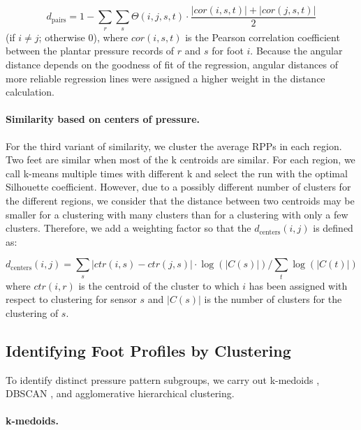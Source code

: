 \documentclass[
  oneside]{book}
\begin{document}
\begin{equation}
d_{\text{pairs}}=1-\sum_{r}\sum_{s} \Theta(i,j,s,t)\cdot \frac{|cor(i,s,t)| + |cor(j,s,t)|}{2}
\label{eq:simpairs}
\end{equation}
(if \(i\neq j\); otherwise 0), where \(cor(i,s,t)\) is the Pearson correlation coefficient between the plantar pressure records of \(r\) and \(s\) for foot \(i\).
Because the angular distance depends on the goodness of fit of the regression, angular distances of more reliable regression lines were assigned a higher weight in the distance calculation.

\paragraph*{Similarity based on centers of pressure.}

For the third variant of similarity, we cluster the average RPPs in each region.
Two feet are similar when most of the k centroids are similar.
For each region, we call k-means multiple times with different k and select the run with the optimal Silhouette coefficient.
However, due to a possibly different number of clusters for the different regions, we consider that the distance between two centroids may be smaller for a clustering with many clusters than for a clustering with only a few clusters. Therefore, we add a weighting factor so that the \(d_{\text{centers}}(i,j)\) is defined as:

\begin{equation}
d_{\text{centers}}(i,j) = \sum_{s}{}\left|ctr(i,s) - ctr(j,s)\right| \cdot \log(|C(s)|)/\sum_{t}\log(|C(t)|)
\label{eq:simcenters}
\end{equation}
where \(ctr(i,r)\) is the centroid of the cluster to which \(i\) has been assigned with respect to clustering for sensor \(s\) and \(|C(s)|\) is the number of clusters for the clustering of \(s\).

\hypertarget{diabfoot-approach-clustering}{%
\subsection{Identifying Foot Profiles by Clustering}\label{diabfoot-approach-clustering}}

To identify distinct pressure pattern subgroups, we carry out k-medoids \autocite{Kaufman:PAM87}, DBSCAN \autocite{EsterEtAl:DBSCAN96}, and agglomerative hierarchical clustering.

\paragraph*{k-medoids.}
\end{document}
